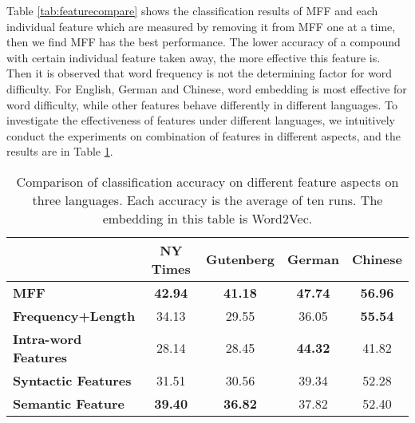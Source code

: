 Table \ref{tab:featurecompare} shows the classification results of MFF
and each individual feature which are measured by removing it from MFF one at a time,
then we find MFF has the best performance.
The lower accuracy of a compound with certain individual feature taken away, the more effective this feature is.
Then it is observed that 
word frequency is not the determining factor for word difficulty.
For English, German and Chinese, word embedding is most effective for word difficulty,
while other features behave differently in different languages.
To investigate the effectiveness of  features under different languages, 
we intuitively conduct the experiments on combination of features in different aspects, 
and the results are in Table \ref{tab:featureL}.

\begin{table}[ht]
	\scriptsize
	\setlength{\abovecaptionskip}{0pt}
	\setlength{\belowcaptionskip}{0pt}
	\begin{center}
		\begin{tabular}{lcccc}
		\toprule[1pt]
		\textbf{}            & \textbf{NY Times}& \textbf{Gutenberg} & \textbf{German} & \textbf{Chinese} \\
		\midrule
		\textbf{MFF}       &      \textbf{42.94}       &   \textbf{41.18}   &\textbf{47.74}    & \textbf{56.96}  \\
		\midrule
		\textbf{Frequency+Length} &      34.13        &      29.55        &      36.05    & \textbf{55.54}  \\ 
		\textbf{Intra-word Features} &      28.14        &      28.45        &      \textbf{44.32}     & 41.82  \\ 
		\textbf{Syntactic Features}     &      31.51        &      30.56        &      39.34    &   52.28  \\ 
		\textbf{Semantic Feature}       &      \textbf{39.40}       &      \textbf{36.82}       &      37.82     & 52.40   \\ 
		\bottomrule[1pt]
	\end{tabular}
	\end{center}
\caption{\label{tab:featureL} Comparison of classification accuracy on different feature aspects on three languages.
Each accuracy is the average of ten runs. The embedding in this table is Word2Vec.}
\end{table}
 
